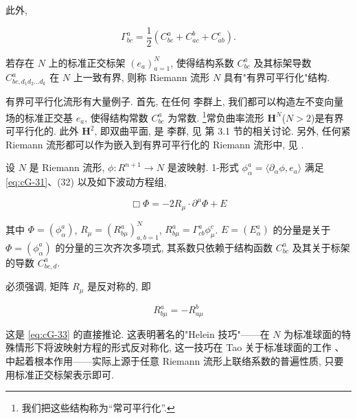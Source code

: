 此外, 

\[
\Gamma_ {b c} ^ {a} = \frac {1}{2} \left(C _ {b c} ^ {a} + C _ {a c} ^ {b} + C _ {a b} ^ {c} \right).
\]

\begin{definition}\label{def:cG-2.11}
若存在 $N$ 上的标准正交标架 $(e_{a})_{a=1}^{N}$, 使得结构系数 $C_{bc}^{a}$ 及其标架导数 $C_{bc, d_{1}d_{2}\ldots d_{k}}^{a}$ 在 $N$ 上一致有界, 则称 Riemann 流形 $N$ 具有"有界可平行化"结构. 
\end{definition}

\begin{remark}\label{rem:cG-2.12}
有界可平行化流形有大量例子. 首先, 在任何 李群上, 我们都可以构造左不变向量场的标准正交基 $e_a$, 使得结构常数 $C_{bc}^a$ 为常数. \footnote{我们把这些结构称为``常可平行化''.}常负曲率流形 $\mathbf{H}^N$($N > 2$)是有界可平行化的. 此外 $\mathbf{H}^2$, 即双曲平面, 是 李群, 见 \cite{gfref11} 第 3.1 节的相关讨论. 另外, 任何紧 Riemann 流形都可以作为嵌入到有界可平行化的 Riemann 流形中, 见 \cite{gfref11}. 
\end{remark}

\begin{proposition}\label{prop:cG-2.13}
设 $N$ 是 Riemann 流形, $\phi: R^{n+1} \longrightarrow N$ 是波映射. 1-形式 $\phi_{\alpha}^{a} = \langle \partial_{\alpha}\phi,  e_{a} \rangle$ 满足\eqref{eq:cG-31}、(32) 以及如下波动方程组, 

\begin{equation}
\Box \Phi = - 2 R _ {\mu} \cdot \partial^ {\mu} \Phi + E\label{eq:cG-34}
\end{equation}

其中 $\Phi = (\phi_{\alpha}^{a})$, $R_{\mu} = (R_{b\mu}^{a})_{a, b = 1}^{N}$, $R_{b\mu}^{a} = \Gamma_{cb}^{a}\phi_{\mu}^{c}$. $E = (E_{\alpha}^{a})$ 的分量是关于 $\Phi = (\phi_{\alpha}^{a})$ 的分量的三次齐次多项式, 其系数只依赖于结构函数 $C_{bc}^{a}$ 及其关于标架的导数 $C_{bc, d}^{a}$. 
\end{proposition}

\begin{remark}\label{rem:cG-2.14}
必须强调, 矩阵 $R_{\mu}$ 是反对称的, 即

\begin{equation}
R _ {b \mu} ^ {a} = - R _ {a \mu} ^ {b}\label{eq:cG-35}
\end{equation}

这是 \eqref{eq:cG-33} 的直接推论. 这表明著名的"Helein 技巧"——在 $N$ 为标准球面的特殊情形下将波映射方程的形式反对称化, 这一技巧在 Tao 关于标准球面的工作 \cite{gfref70}、\cite{gfref71} 中起着根本作用——实际上源于任意 Riemann 流形上联络系数的普遍性质, 只要用标准正交标架表示即可. 
\end{remark}

